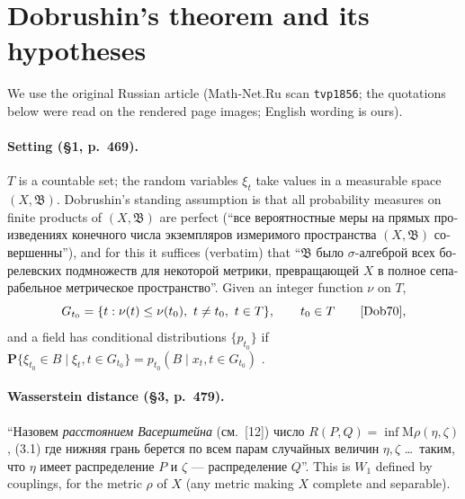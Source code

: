 \documentclass[11pt,a4paper]{article}
\theoremstyle{remark}
\theoremstyle{definition}
\theoremstyle{plain}
\theoremstyle{remark}
\newcommand{\ru}[1]{\foreignlanguage{russian}{#1}}
\begin{document}
\section{Dobrushin's theorem and its hypotheses}\label{sec:dobrushin}

We use the original Russian article \cite{Dob70} (Math-Net.Ru scan \texttt{tvp1856}; the
quotations below were read on the rendered page images; English wording is ours).

\paragraph{Setting (\S1, p.~469).} $T$ is a countable set; the random variables $\xi_t$ take values in a
measurable space $(X,\mathfrak B)$. Dobrushin's standing assumption is that all probability measures on
finite products of $(X,\mathfrak B)$ are perfect (``\ru{все вероятностные меры на прямых произведениях
конечного числа экземпляров измеримого пространства $(X,\mathfrak B)$ совершенны}''), and for this it
suffices (verbatim) that
``\ru{$\mathfrak B$ было $\sigma$-алгеброй всех борелевских подмножеств для некоторой метрики,
превращающей $X$ в полное сепарабельное метрическое пространство}''.
Given an integer function $\nu$ on $T$,
\begin{equation*}
G_{t_0}=\{t:\nu(t)\le\nu(t_0),\ t\neq t_0,\ t\in T\},\qquad t_0\in T \qquad\text{\cite[(1.2)]{Dob70}},
\end{equation*}
and a field has conditional distributions $\{p_{t_0}\}$ if
$\mathbf P\{\xi_{t_0}\in B\mid\xi_t,t\in G_{t_0}\}=p_{t_0}(B\mid x_t,t\in G_{t_0})$ \cite[(1.3)]{Dob70}.

\paragraph{Wasserstein distance (\S3, p.~479).}
``\ru{Назовем \emph{расстоянием Васерштейна} (см.~[12]) число}
$R(P,Q)=\inf \mathrm{M}\rho(\eta,\zeta)$, (3.1)
\ru{где нижняя грань берется по всем парам случайных величин $\eta,\zeta$ \dots\ таким, что $\eta$ имеет
распределение $P$ и $\zeta$ --- распределение $Q$}''. This is $W_1$ defined by couplings, for the metric
$\rho$ of $X$ (any metric making $X$ complete and separable).
\end{document}
